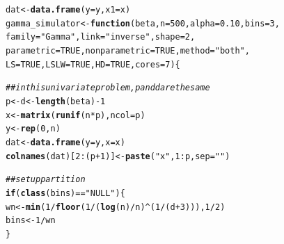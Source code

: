 \documentclass[11pt]{article}\usepackage[]{graphicx}\usepackage[]{color}
\makeatletter
\newcommand{\hlnum}[1]{\textcolor[rgb]{0.686,0.059,0.569}{#1}}%
\newcommand{\hlstr}[1]{\textcolor[rgb]{0.192,0.494,0.8}{#1}}%
\newcommand{\hlcom}[1]{\textcolor[rgb]{0.678,0.584,0.686}{\textit{#1}}}%
\newcommand{\hlopt}[1]{\textcolor[rgb]{0,0,0}{#1}}%
\newcommand{\hlstd}[1]{\textcolor[rgb]{0.345,0.345,0.345}{#1}}%
\newcommand{\hlkwa}[1]{\textcolor[rgb]{0.161,0.373,0.58}{\textbf{#1}}}%
\newcommand{\hlkwb}[1]{\textcolor[rgb]{0.69,0.353,0.396}{#1}}%
\newcommand{\hlkwc}[1]{\textcolor[rgb]{0.333,0.667,0.333}{#1}}%
\newcommand{\hlkwd}[1]{\textcolor[rgb]{0.737,0.353,0.396}{\textbf{#1}}}%
\newenvironment{kframe}{%
 \def\at@end@of@kframe{}%
 \ifinner\ifhmode%
  \def\at@end@of@kframe{\end{minipage}}%
  \begin{minipage}{\columnwidth}%
 \fi\fi%
 \def\FrameCommand##1{\hskip\@totalleftmargin \hskip-\fboxsep
 \colorbox{shadecolor}{##1}\hskip-\fboxsep
     \hskip-\linewidth \hskip-\@totalleftmargin \hskip\columnwidth}%
 \MakeFramed {\advance\hsize-\width
   \@totalleftmargin\z@ \linewidth\hsize
   \@setminipage}}%
 {\par\unskip\endMakeFramed%
 \at@end@of@kframe}
\newenvironment{knitrout}{}{} %
\makeatother
\begin{document}
\begin{knitrout}
\color{fgcolor}\begin{kframe}
\begin{alltt}
\hlstd{dat} \hlkwb{<-} \hlkwd{data.frame}\hlstd{(}\hlkwc{y} \hlstd{= y,} \hlkwc{x1} \hlstd{= x)}
\hlstd{gamma_simulator} \hlkwb{<-} \hlkwa{function}\hlstd{(}\hlkwc{beta}\hlstd{,} \hlkwc{n} \hlstd{=} \hlnum{500}\hlstd{,} \hlkwc{alpha} \hlstd{=} \hlnum{0.10}\hlstd{,} \hlkwc{bins} \hlstd{=} \hlnum{3}\hlstd{,}
  \hlkwc{family} \hlstd{=} \hlstr{"Gamma"}\hlstd{,} \hlkwc{link} \hlstd{=} \hlstr{"inverse"}\hlstd{,} \hlkwc{shape} \hlstd{=} \hlnum{2}\hlstd{,}
  \hlkwc{parametric} \hlstd{=} \hlnum{TRUE}\hlstd{,} \hlkwc{nonparametric} \hlstd{=} \hlnum{TRUE}\hlstd{,} \hlkwc{method} \hlstd{=} \hlstr{"both"}\hlstd{,}
  \hlkwc{LS} \hlstd{=} \hlnum{TRUE}\hlstd{,} \hlkwc{LSLW} \hlstd{=} \hlnum{TRUE}\hlstd{,} \hlkwc{HD} \hlstd{=} \hlnum{TRUE}\hlstd{,} \hlkwc{cores} \hlstd{=} \hlnum{7}\hlstd{)\{}

  \hlcom{## in this univariate problem, p and d are the same}
  \hlstd{p} \hlkwb{<-} \hlstd{d} \hlkwb{<-} \hlkwd{length}\hlstd{(beta)} \hlopt{-} \hlnum{1}
  \hlstd{x} \hlkwb{<-} \hlkwd{matrix}\hlstd{(}\hlkwd{runif}\hlstd{(n}\hlopt{*}\hlstd{p),} \hlkwc{ncol} \hlstd{= p)}
  \hlstd{y} \hlkwb{<-} \hlkwd{rep}\hlstd{(}\hlnum{0}\hlstd{,n)}
  \hlstd{dat} \hlkwb{<-} \hlkwd{data.frame}\hlstd{(}\hlkwc{y} \hlstd{= y,} \hlkwc{x} \hlstd{= x)}
  \hlkwd{colnames}\hlstd{(dat)[}\hlnum{2}\hlopt{:}\hlstd{(p}\hlopt{+}\hlnum{1}\hlstd{)]} \hlkwb{<-} \hlkwd{paste}\hlstd{(}\hlstr{"x"}\hlstd{,} \hlnum{1}\hlopt{:}\hlstd{p,} \hlkwc{sep} \hlstd{=} \hlstr{""}\hlstd{)}

  \hlcom{## set up partition}
  \hlkwa{if}\hlstd{(}\hlkwd{class}\hlstd{(bins)} \hlopt{==} \hlstr{"NULL"}\hlstd{)\{}
    \hlstd{wn} \hlkwb{<-} \hlkwd{min}\hlstd{(}\hlnum{1}\hlopt{/} \hlkwd{floor}\hlstd{(}\hlnum{1} \hlopt{/} \hlstd{(}\hlkwd{log}\hlstd{(n)}\hlopt{/}\hlstd{n)}\hlopt{^}\hlstd{(}\hlnum{1}\hlopt{/}\hlstd{(d}\hlopt{+}\hlnum{3}\hlstd{))),} \hlnum{1}\hlopt{/}\hlnum{2}\hlstd{)}
    \hlstd{bins} \hlkwb{<-} \hlnum{1} \hlopt{/} \hlstd{wn}
  \hlstd{\}}


\end{alltt}
\end{kframe}
\end{knitrout}
\end{document}
